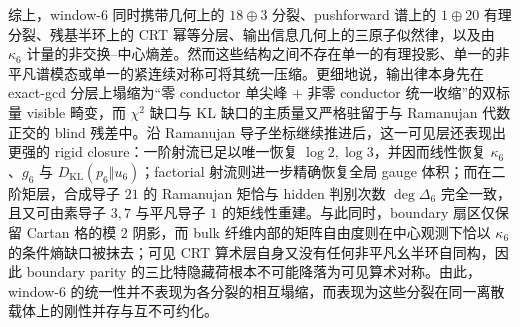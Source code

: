 \noindent
综上，window-\(6\) 同时携带几何上的 \(18\oplus 3\) 分裂、pushforward 谱上的 \(1\oplus 20\) 有理分裂、残基半环上的 CRT 幂等分层、输出信息几何上的三原子似然律，以及由 \(\kappa_6\) 计量的非交换--中心熵差。然而这些结构之间不存在单一的有理投影、单一的非平凡谱模态或单一的紧连续对称可将其统一压缩。更细地说，输出律本身先在 exact-gcd 分层上塌缩为“零 conductor 单尖峰 \(+\) 非零 conductor 统一收缩”的双标量 visible 畸变，而 \(\chi^2\) 缺口与 KL 缺口的主质量又严格驻留于与 Ramanujan 代数正交的 blind 残差中。沿 Ramanujan 导子坐标继续推进后，这一可见层还表现出更强的 rigid closure：一阶射流已足以唯一恢复 \(\log 2,\log 3\)，并因而线性恢复 \(\kappa_6\)、\(g_6\) 与 \(D_{\mathrm{KL}}(p_6\Vert u_6)\)；factorial 射流则进一步精确恢复全局 gauge 体积；而在二阶矩层，合成导子 \(21\) 的 Ramanujan 矩恰与 hidden 判别次数 \(\deg\Delta_6\) 完全一致，且又可由素导子 \(3,7\) 与平凡导子 \(1\) 的矩线性重建。与此同时，boundary 扇区仅保留 Cartan 格的模 \(2\) 阴影，而 bulk 纤维内部的矩阵自由度则在中心观测下恰以 \(\kappa_6\) 的条件熵缺口被抹去；可见 CRT 算术层自身又没有任何非平凡幺半环自同构，因此 boundary parity 的三比特隐藏荷根本不可能降落为可见算术对称。由此，window-\(6\) 的统一性并不表现为各分裂的相互塌缩，而表现为这些分裂在同一离散载体上的刚性并存与互不可约化。

\endinput
